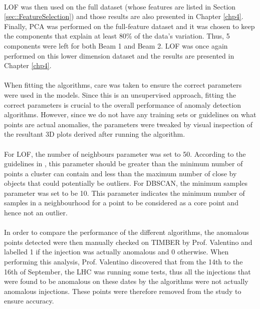 \paragraph{ }\acs{LOF} was then used on the full dataset (whose features are listed in Section \ref{sec::FeatureSelection}) and those results are also presented in Chapter \ref{chp4}. Finally, \acs{PCA} was performed on the full-feature dataset and it was chosen to keep the components that explain at least 80\% of the data's variation. Thus, 5 components were left for both Beam 1 and Beam 2. \acs{LOF} was once again performed on this lower dimension dataset and the results are presented in Chapter \ref{chp4}.

\paragraph{ }When fitting the algorithms, care was taken to ensure the correct parameters were used in the models. Since this is an unsupervised approach, fitting the correct parameters is crucial to the overall performance of anomaly detection algorithms. However, since we do not have any training sets or guidelines on what points are actual anomalies, the parameters were tweaked by visual inspection of the resultant 3D plots derived after running the algorithm. 

\paragraph{ }For \acs{LOF}, the number of neighbours parameter was set to 50. According to the guidelines in \cite{Sklearn2}, this parameter should be greater than the minimum number of points a cluster can contain and less than the maximum number of close by objects that could potentially be outliers. For \acs{DBSCAN}, the minimum samples parameter was set to be 10. This parameter indicates the minimum number of samples in a neighbourhood for a point to be considered as a core point and hence not an outlier.

\paragraph{ }In order to compare the performance of the different algorithms, the anomalous points detected were then manually checked on \acs{TIMBER} by Prof. Valentino and labelled 1 if the injection was actually anomalous and 0 otherwise. When performing this analysis, Prof. Valentino discovered that from the 14th to the 16th of September, the \acs{LHC} was running some tests, thus all the injections that were found to be anomalous on these dates by the algorithms were not actually anomalous injections. These points were therefore removed from the study to ensure accuracy. 
